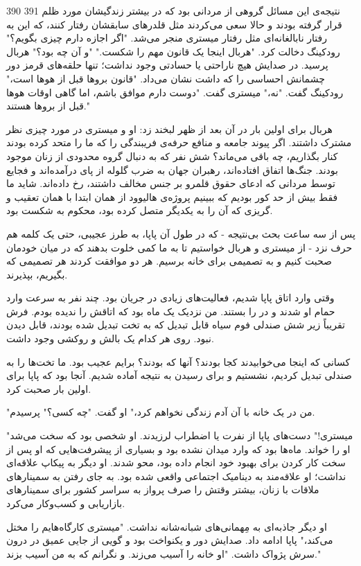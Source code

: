 390 391
نتیجه‌ی این مسائل گروهی از مردانی بود که در بیشتر زندگیشان مورد ظلم قرار گرفته بودند و حالا سعی می‌کردند مثل قلدرهای سابقشان رفتار کنند، که این به رفتار نابالغانه‌ای مثل رفتار میستری منجر می‌شد. 
"اگر اجازه دارم چیزی بگویم؟" رودکینگ دخالت کرد. "هربال اینجا یک قانون مهم را شکست." 
"و آن چه بود؟" هربال پرسید. در صدایش هیچ ناراحتی یا حسادتی وجود نداشت؛ تنها حلقه‌های قرمز دور چشمانش احساسی را که داشت نشان می‌داد. 
"قانون بروها قبل از هوها است،" رودکینگ گفت. 
"نه،" میستری گفت. "دوست دارم موافق باشم، اما گاهی اوقات هوها قبل از بروها هستند."

هربال برای اولین بار در آن بعد از ظهر لبخند زد: او و میستری در مورد چیزی نظر مشترک داشتند. 
اگر پیوند جامعه و منافع حرفه‌ی فریبندگی را که ما را متحد کرده بودند کنار بگذاریم، چه باقی می‌ماند؟ شش نفر که به دنبال گروه محدودی از زنان موجود بودند. جنگ‌ها اتفاق افتاده‌اند، رهبران جهان به ضرب گلوله از پای درآمده‌اند و فجایع توسط مردانی که ادعای حقوق قلمرو بر جنس مخالف داشتند، رخ داده‌اند. شاید ما فقط بیش از حد کور بودیم که ببینیم پروژه‌ی هالیوود از همان ابتدا با همان تعقیب و گریزی که آن را به یکدیگر متصل کرده بود، محکوم به شکست بود.

پس از سه ساعت بحث بی‌نتیجه - که در طول آن پاپا، به طرز عجیبی، حتی یک کلمه هم حرف نزد - از میستری و هربال خواستیم تا به ما کمی خلوت بدهند که در میان خودمان صحبت کنیم و به تصمیمی برای خانه برسیم. هر دو موافقت کردند هر تصمیمی که بگیریم، بپذیرند.

وقتی وارد اتاق پاپا شدیم، فعالیت‌های زیادی در جریان بود. چند نفر به سرعت وارد حمام او شدند و در را بستند. من نزدیک یک ماه بود که اتاقش را ندیده بودم. فرش تقریباً زیر شش صندلی فوم سیاه قابل تبدیل که به تخت تبدیل شده بودند، قابل دیدن نبود. روی هر کدام یک بالش و روکشی وجود داشت. 

کسانی که اینجا می‌خوابیدند کجا بودند؟ آنها که بودند؟ برایم عجیب بود. ما تخت‌ها را به صندلی تبدیل کردیم، نشستیم و برای رسیدن به نتیجه آماده شدیم. آنجا بود که پاپا برای اولین بار صحبت کرد.

"من در یک خانه با آن آدم زندگی نخواهم کرد،" او گفت. 
"چه کسی؟" پرسیدم. 

"میستری!" 
دست‌های پاپا از نفرت یا اضطراب لرزیدند. او شخصی بود که سخت می‌شد او را خواند. ماه‌ها بود که وارد میدان نشده بود و بسیاری از پیشرفت‌هایی که او پس از سخت کار کردن برای بهبود خود انجام داده بود، محو شدند. او دیگر به پیکاپ علاقه‌ای نداشت؛ او علاقه‌مند به دینامیک اجتماعی واقعی شده بود. به جای رفتن به سمینارهای ملاقات با زنان، بیشتر وقتش را صرف پرواز به سراسر کشور برای سمینارهای بازاریابی و کسب‌وکار می‌کرد.

او دیگر جاذبه‌ای به مِهمانی‌های شبانه‌شانه نداشت. "میستری کارگاه‌هایم را مختل می‌کند،" پاپا ادامه داد. صدایش دور و یکنواخت بود و گویی از جایی عمیق در درون سرش پژواک داشت. "او خانه را آسیب می‌زند. و نگرانم که به من آسیب بزند."

